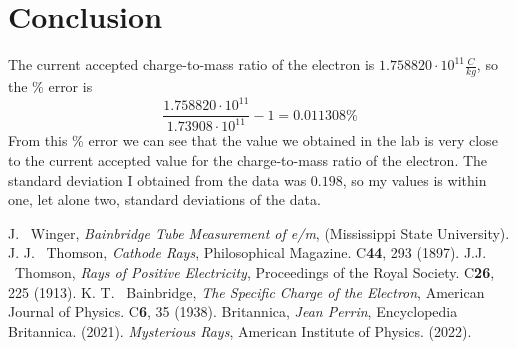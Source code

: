 \documentclass[aps,prl,10pt,twocolumn,floatfix]{revtex4-2}
\begin{document}
\section{Conclusion}
The current accepted charge-to-mass ratio of the electron is $1.758820\cdot10^{11}\frac{C}{kg}$, so the \% error is
\begin{equation}
	\frac{1.758820\cdot10^{11}}{1.73908\cdot10^{11}} -1=0.011308\%
\end{equation}
From this \% error we can see that the value we obtained in the lab is very close to the current accepted value for the charge-to-mass ratio of the electron. 
The standard deviation I obtained from the data was $0.198$, so my values is within one, let alone two, standard deviations of the data. 

\begin{thebibliography}{9}
 J. ~Winger, \textit{Bainbridge Tube Measurement of e/m}, (Mississippi State University).
 J. J. ~Thomson, \textit{Cathode Rays}, Philosophical Magazine. C\textbf{44}, 293 (1897).
 J.J. ~Thomson, \textit{Rays of Positive Electricity}, Proceedings of the Royal Society. C\textbf{26}, 225 (1913).
 K. T. ~Bainbridge, \textit{The Specific Charge of the Electron}, American Journal of Physics. C\textbf{6}, 35 (1938).
 Britannica, \textit{Jean Perrin}, Encyclopedia Britannica. (2021).
 \textit{Mysterious Rays}, American Institute of Physics. (2022).
\end{thebibliography}
\end{document}
